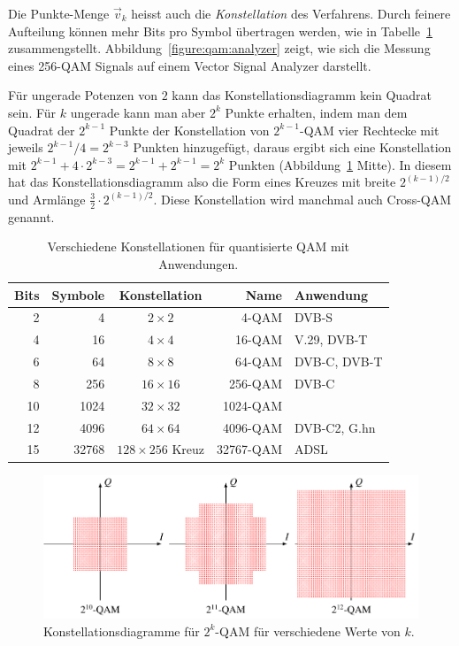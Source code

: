Die Punkte-Menge $\vec{v}_k$ heisst auch die {\em Konstellation}
des Verfahrens.
Durch feinere Aufteilung können mehr Bits pro Symbol übertragen werden,
wie in Tabelle~\ref{table:qam:xqam} zusammengstellt.
Abbildung~\ref{figure:qam:analyzer} zeigt, wie sich die Messung eines 256-QAM 
Signals auf einem Vector Signal Analyzer darstellt.

Für ungerade Potenzen von $2$ kann das Konstellationsdiagramm kein
Quadrat sein.
Für $k$ ungerade kann man aber $2^k$ Punkte erhalten, indem man
dem Quadrat der $2^{k-1}$ Punkte der Konstellation von $2^{k-1}$-QAM
vier Rechtecke mit jeweils $2^{k-1}/4=2^{k-3}$ Punkten hinzugefügt, daraus
ergibt sich eine Konstellation mit
$2^{k-1}+4\cdot 2^{k-3}=2^{k-1}+2^{k-1}=2^k$
Punkten (Abbildung~\ref{qam:figure:qam-konstellation} Mitte).
In diesem hat das Konstellationsdiagramm also die Form
eines Kreuzes mit breite $2^{(k-1)/2}$ und Armlänge
$\frac32\cdot 2^{(k-1)/2}$.
Diese Konstellation wird manchmal auch Cross-QAM genannt.

\begin{table}
\centering
\begin{tabular}{rrcrl}
\hline
Bits&Symbole&Konstellation&Name&Anwendung\\
\hline
   2&      4&$  2\times   2$      &    4-QAM&DVB-S       \\
   4&     16&$  4\times   4$      &   16-QAM&V.29, DVB-T \\
   6&     64&$  8\times   8$      &   64-QAM&DVB-C, DVB-T\\
   8&    256&$ 16\times  16$      &  256-QAM&DVB-C       \\
  10&   1024&$ 32\times  32$      & 1024-QAM&            \\
  12&   4096&$ 64\times  64$      & 4096-QAM&DVB-C2, G.hn\\
  15&  32768&$128\times 256$ Kreuz&32767-QAM&ADSL        \\
\hline
\end{tabular}
\caption{Verschiedene Konstellationen für quantisierte QAM mit Anwendungen.
\label{table:qam:xqam}}
\end{table}

\begin{figure}
\centering
\includegraphics{applications/qam/images/qam.pdf}
\caption{Konstellationsdiagramme für $2^k$-QAM für verschiedene Werte von $k$.
\label{qam:figure:qam-konstellation}}
\end{figure}

